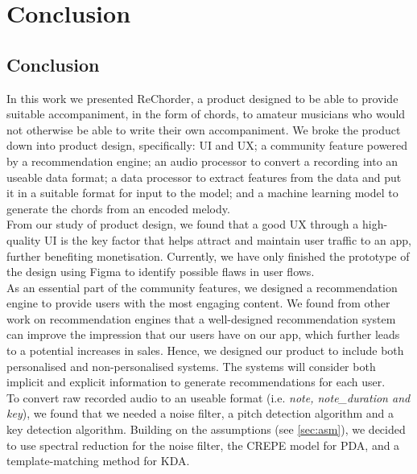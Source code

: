 


\chapter{Conclusion} %
\label{Conclusion} %

\section{Conclusion}

In this work we presented ReChorder, a product designed to be able to provide suitable accompaniment, in the form of chords, to amateur musicians who would not otherwise be able to write their own accompaniment.
We broke the product down into 
product design, specifically: UI and UX; 
a community feature powered by a recommendation engine; 
an audio processor to convert a recording into an useable data format; 
a data processor to extract features from the data and put it in a suitable format for input to the model;
and a machine learning model to generate the chords from an encoded melody. 
\\
From our study of product design, we found that a good UX through a high-quality UI is the key factor that helps attract and maintain user traffic to an app, further benefiting monetisation. 
Currently, we have only finished the prototype of the design using Figma to identify possible flaws in user flows. 
\\
As an essential part of the community features, we designed a recommendation engine to provide users with the most engaging content.
We found from other work on recommendation engines that a well-designed recommendation system can improve the impression that our users have on our app, which further leads to a potential increases in sales.
Hence, we designed our product to include both personalised and non-personalised systems. 
The systems will consider both implicit and explicit information to generate recommendations for each user.
\\
To convert raw recorded audio to an useable format (i.e. \emph{note, note\_duration and key}), we found that we needed a noise filter, a pitch detection algorithm and a key detection algorithm. 
Building on the assumptions (see \cref{sec:asm}), we decided to use spectral reduction for the noise filter, the CREPE model for PDA, and a template-matching method for KDA.
